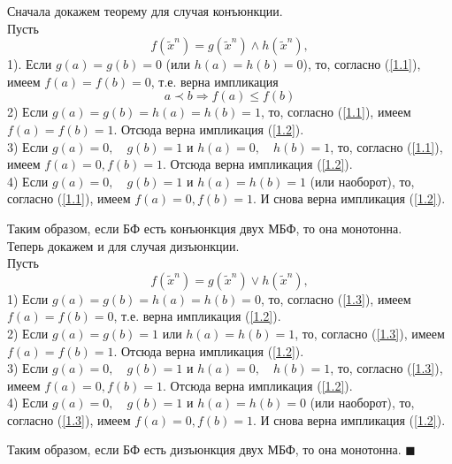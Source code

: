 Сначала докажем теорему для случая конъюнкции. \\
 Пусть 
 \begin{equation}\label{1.1}
 f(\widetilde{x}^n) = g(\widetilde{x}^n) \wedge h(\widetilde{x}^n),
 \end{equation}
  1). Если $g(a) = g(b) = 0$ (или $h(a) = h(b) = 0$), то, согласно (\ref{1.1}), имеем $f(a) = f(b) = 0$, т.е.
  верна импликация
  \begin{equation}\label{1.2}
	      a \prec b \Rightarrow f(a) \leq f(b)
  \end{equation}
  2) Если $g(a) = g(b) = h(a) = h(b) = 1$, то, согласно (\ref{1.1}), имеем $f(a) = f(b) = 1$. Отсюда
  верна импликация (\ref{1.2}).\\
  3) Если $g(a) = 0, \quad g(b) = 1$ и $h(a) = 0, \quad h(b) = 1$, то, согласно (\ref{1.1}), имеем $f(a) = 0, f(b) = 1$. Отсюда
  верна импликация (\ref{1.2}).\\
  4) Если $g(a) = 0, \quad g(b) = 1$ и $h(a) = h(b) = 1$ (или наоборот), то, согласно (\ref{1.1}), имеем $f(a) = 0, f(b) = 1$. И снова
  верна импликация (\ref{1.2}).\par
    Таким образом, если БФ есть конъюнкция двух МБФ, то она монотонна.\\
  
Теперь докажем и для случая дизъюнкции. \\
 Пусть 
 \begin{equation}\label{1.3}
 f(\widetilde{x}^n) = g(\widetilde{x}^n) \vee h(\widetilde{x}^n),
 \end{equation}
  1) Если $g(a) = g(b) = h(a) = h(b) = 0$, то, согласно (\ref{1.3}), имеем $f(a) = f(b) = 0$, т.е.
  верна импликация (\ref{1.2}).\\
  2) Если $g(a) = g(b) =  1$ или $h(a) = h(b) = 1$, то, согласно (\ref{1.3}), имеем $f(a) = f(b) = 1$. Отсюда
  верна импликация (\ref{1.2}).\\
  3) Если $g(a) = 0, \quad g(b) = 1$ и $h(a) = 0, \quad h(b) = 1$, то, согласно (\ref{1.3}), имеем $f(a) = 0, f(b) = 1$. Отсюда
  верна импликация (\ref{1.2}).\\
  4) Если $g(a) = 0, \quad g(b) = 1$ и $h(a) = h(b) = 0$ (или наоборот), то, согласно (\ref{1.3}), имеем $f(a) = 0, f(b) = 1$. И снова
  верна импликация (\ref{1.2}).\par
  Таким образом, если БФ есть дизъюнкция двух МБФ, то она монотонна.
  $\blacksquare$
  
